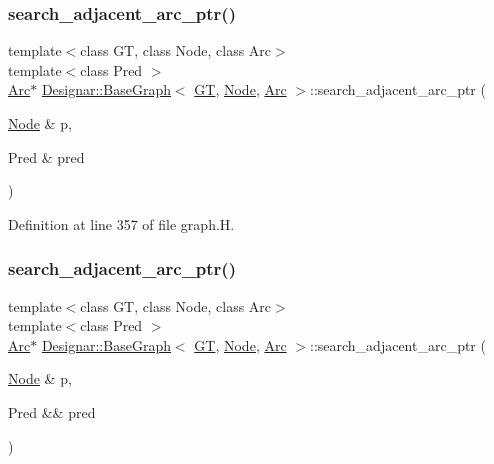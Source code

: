 \subsubsection{\texorpdfstring{search\+\_\+adjacent\+\_\+arc\+\_\+ptr()}{search\_adjacent\_arc\_ptr()}\hspace{0.1cm}{\footnotesize\ttfamily [1/2]}}
{\footnotesize\ttfamily template$<$class GT, class Node, class Arc$>$ \\
template$<$class Pred $>$ \\
\hyperlink{namespace_designar_a3f55fb5513d62ff47cbc8f72b8e95d6f}{Arc}$\ast$ \hyperlink{class_designar_1_1_base_graph}{Designar\+::\+Base\+Graph}$<$ \hyperlink{demo-buildgraph_8_c_a3001c40d2c31ca87ed96cd7d1334a55e}{GT}, \hyperlink{namespace_designar_a5af326c65aa2bd26b26c410f2030d09e}{Node}, \hyperlink{namespace_designar_a3f55fb5513d62ff47cbc8f72b8e95d6f}{Arc} $>$\+::search\+\_\+adjacent\+\_\+arc\+\_\+ptr (\begin{DoxyParamCaption}\item[{\hyperlink{namespace_designar_a5af326c65aa2bd26b26c410f2030d09e}{Node} \&}]{p,  }\item[{Pred \&}]{pred }\end{DoxyParamCaption})\hspace{0.3cm}{\ttfamily [inline]}}



Definition at line 357 of file graph.\+H.

\mbox{\label{class_designar_1_1_base_graph_aac7ed362d5f21fcc6e583d4b9e03babb}} 
\subsubsection{\texorpdfstring{search\+\_\+adjacent\+\_\+arc\+\_\+ptr()}{search\_adjacent\_arc\_ptr()}\hspace{0.1cm}{\footnotesize\ttfamily [2/2]}}
{\footnotesize\ttfamily template$<$class GT, class Node, class Arc$>$ \\
template$<$class Pred $>$ \\
\hyperlink{namespace_designar_a3f55fb5513d62ff47cbc8f72b8e95d6f}{Arc}$\ast$ \hyperlink{class_designar_1_1_base_graph}{Designar\+::\+Base\+Graph}$<$ \hyperlink{demo-buildgraph_8_c_a3001c40d2c31ca87ed96cd7d1334a55e}{GT}, \hyperlink{namespace_designar_a5af326c65aa2bd26b26c410f2030d09e}{Node}, \hyperlink{namespace_designar_a3f55fb5513d62ff47cbc8f72b8e95d6f}{Arc} $>$\+::search\+\_\+adjacent\+\_\+arc\+\_\+ptr (\begin{DoxyParamCaption}\item[{\hyperlink{namespace_designar_a5af326c65aa2bd26b26c410f2030d09e}{Node} \&}]{p,  }\item[{Pred \&\&}]{pred }\end{DoxyParamCaption})\hspace{0.3cm}{\ttfamily [inline]}}



